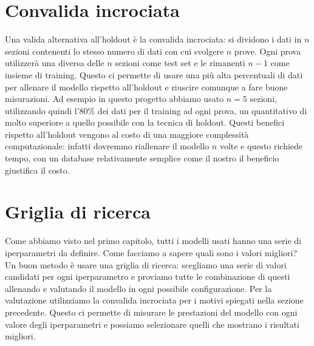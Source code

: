 \documentclass[a4paper,12pt]{report}
\begin{document}

\section{Convalida incrociata}

Una valida alternativa all'holdout è la convalida incrociata: si dividono i dati
in $n$ sezioni contenenti lo stesso numero di dati con cui svolgere $n$ prove.
Ogni prova utilizzerà una diversa delle $n$ sezioni come test set e le rimanenti
$n-1$ come insieme di training. Questo ci permette di usare una più alta
percentuali di dati per allenare il modello rispetto all'holdout e riuscire
comunque a fare buone misurazioni. Ad esempio in questo progetto abbiamo usato
$n=5$ sezioni, utilizzando quindi l'80\% dei dati per il training ad ogni prova,
un quantitativo di molto superiore a quello possibile con la tecnica di holdout.
Questi benefici rispetto all'holdout vengono al costo di una maggiore
complessità computazionale: infatti dovremmo riallenare il modello $n$
volte e questo richiede tempo, con un database relativamente semplice come il
nostro il beneficio giustifica il costo.

\section{Griglia di ricerca}
Come abbiamo visto nel primo capitolo, tutti i modelli usati hanno una serie di
iperparametri da definire. Come facciamo a sapere quali sono i valori migliori?
Un buon metodo è usare una griglia di ricerca: scegliamo una serie di valori
candidati per ogni iperparametro e proviamo tutte le combinazione di questi
allenando e valutando il modello in ogni possibile configurazione. Per la
valutazione utilizziamo la convalida incrociata per i motivi spiegati nella
sezione precedente. Questo ci permette di misurare le prestazioni del modello
con ogni valore degli iperparametri e possiamo selezionare quelli che mostrano i
risultati migliori.
\end{document}
